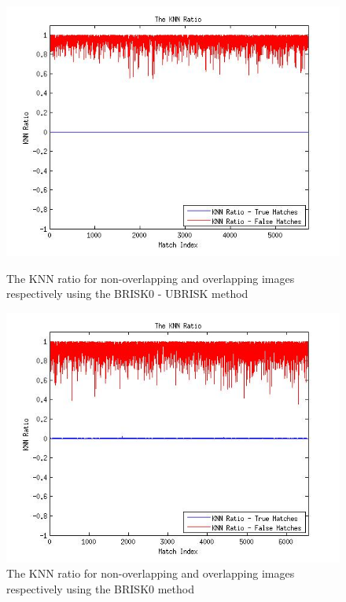 \documentclass{article}
\begin{document}
\begin{figure}[h!]
\begin{minipage}[b]{0.5\linewidth}
\includegraphics[scale=0.5]{../Drawings/KNNRatio_SBRISK_UBRISK_20_60.jpg}
\caption{The KNN ratio for non-overlapping and overlapping images respectively using the BRISK0 - UBRISK method}
\label{fig:b0ubknnratio}
\end{minipage}
\hspace{0.5cm}
\begin{minipage}[b]{0.5\linewidth}
\includegraphics[scale=0.5]{../Drawings/KNNRatio_SBRISK_SURF2D_20_60.jpg}
\caption{The KNN ratio for non-overlapping and overlapping images respectively using the BRISK0 method}
\label{fig:b0knnratio}
\end{minipage}
\end{figure}
\end{document}

